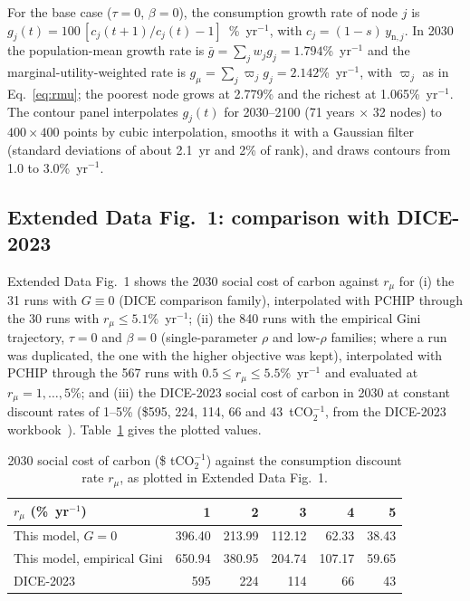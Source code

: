 \documentclass[11pt]{article}
\begin{document}
For the base case ($\tau = 0$, $\beta = 0$), the consumption growth rate of
node $j$ is $g_j(t) = 100\,[c_j(t+1)/c_j(t) - 1]$~\%~yr$^{-1}$, with
$c_j = (1-s)\,y_{\mathrm{n},j}$. In 2030 the population-mean growth rate is
$\bar g = \sum_j w_j g_j = 1.794$\%~yr$^{-1}$ and the
marginal-utility-weighted rate is $g_\mu = \sum_j\varpi_j g_j =
2.142$\%~yr$^{-1}$, with $\varpi_j$ as in Eq.~\eqref{eq:rmu}; the poorest node
grows at 2.779\% and the richest at 1.065\%~yr$^{-1}$. The contour panel
interpolates $g_j(t)$ for 2030--2100 (71 years $\times$ 32 nodes) to
$400\times400$ points by cubic interpolation, smooths it with a Gaussian
filter (standard deviations of about 2.1~yr and 2\% of rank), and draws
contours from 1.0 to 3.0\%~yr$^{-1}$.

\subsection{Extended Data Fig.~1: comparison with DICE-2023}

Extended Data Fig.~1 shows the 2030 social cost of carbon against $r_\mu$ for
(i) the 31 runs with
$G\equiv0$ (DICE comparison family), interpolated with PCHIP through the 30
runs with $r_\mu\le5.1$\%~yr$^{-1}$; (ii) the 840 runs with the empirical Gini
trajectory, $\tau = 0$ and $\beta = 0$ (single-parameter $\rho$ and low-$\rho$
families; where a run was duplicated, the one with the higher objective was
kept), interpolated with PCHIP through the 567 runs with
$0.5\le r_\mu\le5.5$\%~yr$^{-1}$ and evaluated at $r_\mu = 1, \dots, 5$\%;
and (iii) the DICE-2023 social cost of carbon in 2030 at constant discount rates of
1--5\% (\$595, 224, 114, 66 and 43~tCO$_2^{-1}$, from the DICE-2023
workbook~\cite{BarrageNordhaus2024}).
Table~\ref{tab:figs3} gives the plotted values.

\begin{table}[ht]
\centering
\caption{2030 social cost of carbon (\$ tCO$_2^{-1}$) against the consumption
discount rate $r_\mu$, as plotted in Extended Data Fig.~1.}
\label{tab:figs3}
\small
\begin{tabular}{l r r r r r}
\toprule
$r_\mu$ (\%~yr$^{-1}$) & 1 & 2 & 3 & 4 & 5 \\
\midrule
This model, $G = 0$ & 396.40 & 213.99 & 112.12 & 62.33 & 38.43 \\
This model, empirical Gini & 650.94 & 380.95 & 204.74 & 107.17 & 59.65 \\
DICE-2023 & 595 & 224 & 114 & 66 & 43 \\
\bottomrule
\end{tabular}
\end{table}
\end{document}
